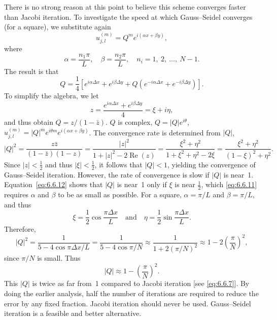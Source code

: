There is no strong reason at this point to believe this scheme converges faster than Jacobi iteration.  To investigate the speed at which Gauss--Seidel converges (for a square), we substitute again
\begin{equation}
u_{j,l}^{(m)} = Q^m e^{i(\alpha x + \beta y)},
\label{eq:6.6.9}
\end{equation}
where
\[
\alpha = \frac{n_1\pi}{L},\quad \beta = \frac{n_2\pi}{L},\quad n_i = 1,\ 2,\ \ldots,\ N-1.
\]
The result is that
\begin{equation}
Q = \frac{1}{4}\left[e^{i\alpha\Delta x} + e^{i\beta\Delta y} + Q\left(e^{-i\alpha\Delta x} + e^{-i\beta\Delta y}\right)\right].
\label{eq:6.6.10}
\end{equation}
To simplify the algebra, we let
\begin{equation}
z = \frac{e^{i\alpha\Delta x} + e^{i\beta\Delta y}}{4} = \xi + i\eta,
\label{eq:6.6.11}
\end{equation}
and thus obtain $Q = z/(1-\bar{z})$.  $Q$ is complex, $Q = |Q|e^{i\theta}$, $u_{j,l}^{(m)} = |Q|^m e^{i\theta m} e^{i(\alpha x + \beta y)}$.  The convergence rate is determined from $|Q|$,
\begin{equation}
|Q|^2 = \frac{z\bar{z}}{(1-\bar{z})(1-z)} = \frac{|z|^2}{1 + |z|^2 - 2\operatorname{Re}(z)} = \frac{\xi^2 + \eta^2}{1 + \xi^2 + \eta^2 - 2\xi} = \frac{\xi^2 + \eta^2}{(1-\xi)^2 + \eta^2}.
\label{eq:6.6.12}
\end{equation}
Since $|z| < \frac{1}{2}$ and thus $|\xi| < \frac{1}{2}$, it follows that $|Q| < 1$, yielding the convergence of Gauss--Seidel iteration.  However, the rate of convergence is slow if $|Q|$ is near~1.  Equation~\eqref{eq:6.6.12} shows that $|Q|$ is near~1 only if $\xi$ is near $\frac{1}{2}$, which \eqref{eq:6.6.11} requires $\alpha$ and $\beta$ to be as small as possible.  For a square, $\alpha = \pi/L$ and $\beta = \pi/L$, and thus
\[
\xi = \frac{1}{2}\cos\frac{\pi\Delta x}{L} \quad\text{and}\quad \eta = \frac{1}{2}\sin\frac{\pi\Delta x}{L}.
\]
Therefore,
\[
|Q|^2 = \frac{1}{5 - 4\cos\pi\Delta x/L} = \frac{1}{5 - 4\cos\pi/N} \approx \frac{1}{1 + 2(\pi/N)^2} \approx 1 - 2\left(\frac{\pi}{N}\right)^2,
\]
since $\pi/N$ is small.  Thus
\[
|Q| \approx 1 - \left(\frac{\pi}{N}\right)^2.
\]
This $|Q|$ is twice as far from~1 compared to Jacobi iteration [see \eqref{eq:6.6.7}].  By doing the earlier analysis, half the number of iterations are required to reduce the error by any fixed fraction.  Jacobi iteration should never be used.  Gauss--Seidel iteration is a feasible and better alternative.

